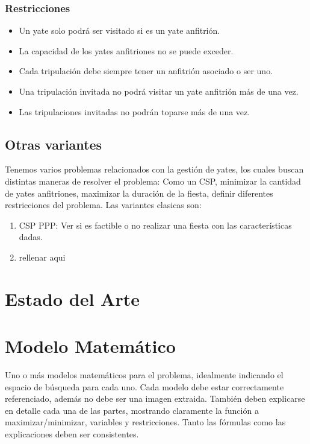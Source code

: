 \documentclass[letter, 10pt]{article}
\begin{document}
\subsubsection{Restricciones}
\begin{itemize}
\item Un yate solo podrá ser visitado si es un yate anfitrión.
\item La capacidad de los yates anfitriones no se puede exceder.
\item Cada tripulación debe siempre tener un anfitrión asociado o ser uno.
\item Una tripulación invitada no podrá visitar un yate anfitrión más de una vez.
\item Las tripulaciones invitadas no podrán toparse más de una vez.
\end{itemize}

\subsection{Otras variantes}
Tenemos varios problemas relacionados con la gestión de yates, los cuales buscan distintas maneras de resolver el problema: Como un CSP, minimizar la cantidad de yates anfitriones, maximizar la duración de la fiesta, definir diferentes restricciones del problema. Las variantes clasicas son:

\begin{enumerate}
    \item CSP PPP: Ver si es factible o no realizar una fiesta con las características dadas. ~\cite{PPP_ILP_CPC_CPP}
    
    \item rellenar aqui 
\end{enumerate}

\section{Estado del Arte}




\section{Modelo Matem\'atico}
Uno o m\'as modelos matem\'aticos para el problema, idealmente indicando el espacio de b\'usqueda para cada uno. Cada modelo debe estar correctamente referenciado, adem\'as no debe ser una imagen extraida. Tambi\'en deben explicarse en detalle cada una de las partes, mostrando claramente la funci\'on a maximizar/minimizar, variables y restricciones. Tanto las f\'ormulas como las explicaciones deben ser consistentes.
\end{document}
